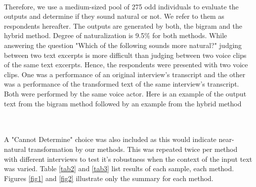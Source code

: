 \documentclass[journal]{IEEEtran}
\begin{document}
\noindent{}
\\

Therefore, we use a medium-sized pool of 275 odd individuals to evaluate the outputs and determine if they sound natural or not. We refer to them as respondents hereafter. The outputs are generated by both, the bigram and the hybrid method. Degree of naturalization is 9.5\% for both methods. While answering the question "Which of the following sounds more natural?" judging between two text excerpts is more difficult than judging between two voice clips of the same text excerpts. Hence, the respondents were presented with two voice clips. One was a performance of an original interview's transcript and the other was a performance of the transformed text of the same interview's transcript. Both were performed by the same voice actor. Here is an example of the output text from the bigram method followed by an example from the hybrid method


\noindent{}
\\


\noindent{}
\\

A "Cannot Determine" choice was also included as this would indicate near-natural transformation by our methods. This was repeated twice per method with different interviews to test it's robustness when the context of the input text was varied. Table \ref{tab2} and \ref{tab3} list results of each sample, each method. Figures \ref{fig1} and \ref{fig2} illustrate only the summary for each method.
\end{document}

